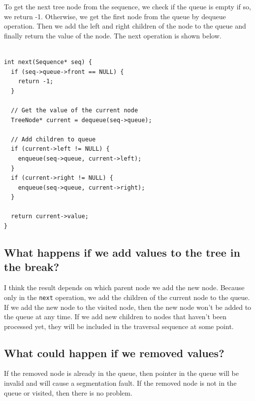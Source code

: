 \documentclass[a4paper,11pt]{article}
\begin{document}
To get the next tree node from the sequence, we check if the queue is empty if so, we return -1. Otherwise,
we get the first node from the queue by dequeue operation. Then we add the left and right children of the
node to the queue and finally return the value of the node. The next operation is shown below.

\begin{verbatim}

int next(Sequence* seq) {
  if (seq->queue->front == NULL) {
    return -1;
  }

  // Get the value of the current node
  TreeNode* current = dequeue(seq->queue);

  // Add children to queue
  if (current->left != NULL) {
    enqueue(seq->queue, current->left);
  }
  if (current->right != NULL) {
    enqueue(seq->queue, current->right);
  }

  return current->value;
}
\end{verbatim}

\subsection*{What happens if we add values to the tree in the break?}

I think the result depends on which parent node we add the new node. Because only in the {\tt next} operation,
we add the children of the current node to the queue. If we add the new node to the visited node, then the
new node won't be added to the queue at any time. If we add new children to nodes that haven't been processed yet, 
they will be included in the traversal sequence at some point.

\subsection*{What could happen if we removed values?}

If the removed node is already in the queue, then pointer in the queue will be invalid and will cause a segmentation
fault. If the removed node is not in the queue or visited, then there is no problem.
\end{document}
